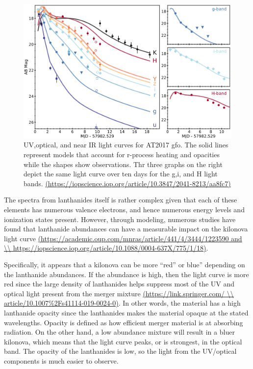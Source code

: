 \documentclass[11pt,a4paper]{article}
\begin{document}
\begin{figure}[h!]
  \includegraphics[width=1\textwidth]{light_curve.png}
  \caption{UV,optical, and near IR light curves for AT2017 gfo. The solid lines represent models that account for r-process heating and opacities while the shapes show observations. Thr three graphs on the right depict the same light curve over ten days for the g,i, and H light bands. \url{(https://iopscience.iop.org/article/10.3847/2041-8213/aa8fc7)} }
\end{figure}

The spectra from lanthanides itself is rather complex given that each of these elements has numerous valence electrons, and hence numerous energy levels and ionization states present. However, through modeling, numerous studies have found that lanthanide abundances can have a measurable impact on the kilonova light curve \url{(https://academic.oup.com/mnras/article/441/4/3444/1223590 and \\ https://iopscience.iop.org/article/10.1088/0004-637X/775/1/18)}.

Specifically, it appears that a kilonova can be more “red” or blue” depending on the lanthanide abundances. If the abundance is high, then the light curve is more red since the large density of lanthanides helps suppress most of the UV and optical light present from the merger mixture \url{(https://link.springer.com/ \\ article/10.1007\%2Fs41114-019-0024-0)}. In other words, the material has a high lanthanide opacity since the lanthanides makes the material opaque at the stated wavelengths. Opacity is defined as how efficient merger material is at absorbing radiation. On the other hand, a low abundance mixture will result in a bluer kilonova, which means that the light curve peaks, or is strongest, in the optical band. The opacity of the lanthanides is low, so the light from the UV/optical components is much easier to observe. 
\end{document}
